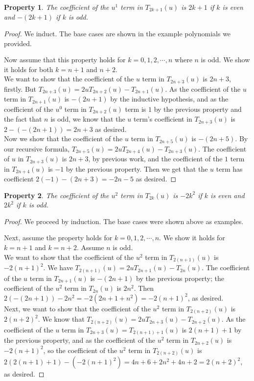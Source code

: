 \documentclass[12pt, letterpaper]{article} %
\newtheorem{theorem}{Property}
\begin{document}
\newpage
\begin{theorem}
The coefficient of the $u^1$ term in $T_{2k+1}(u)$ is $2k+1$ if $k$ is even and $-(2k+1)$ if $k$ is odd.
\end{theorem}

\begin{proof}
We induct. The base cases are shown in the example polynomials we provided.

Now assume that this property holds for $k = 0,1,2,\cdots ,n$ where $n$ is odd. We show it holds for both $k = n+1$ and $n+2$. \\

We want to show that the coefficient of the $u$ term in $T_{2n+3}(u)$ is $2n+3$, firstly. But $T_{2n+3}(u) = 2uT_{2n+2}(u) - T_{2n+1}(u)$. As the coefficient of the $u$ term in $T_{2n+1}(u)$ is $-(2n+1)$ by the inductive hypothesis, and as the coefficient of the $u^0$ term in $T_{2n+2}(u)$ term is $1$ by the previous property and the fact that $n$ is odd, we know that the $u$ term's coefficient in $T_{2n+3}(u)$ is $2 - (-(2n+1)) = 2n + 3$ as desired.\\

Now we show that the coefficient of the $u$ term in $T_{2n+5}(u)$ is $-(2n+5)$. By our recursive formula, $T_{2n+5}(u) = 2uT_{2n+4}(u) - T_{2n+3}(u)$. The coefficient of $u$ in $T_{2n+3}(u)$ is $2n+3$, by previous work, and the coefficient of the $1$ term in $T_{2n+4}(u)$ is $-1$ by the previous property. Then we get that the $u$ term has coefficient $2(-1) - (2n+3) = -2n - 5$ as desired.
\end{proof}

\begin{theorem} The coefficient of the $u^2$ term in $T_{2k}(u)$ is $-2k^2$ if $k$ is even and $2k^2$ if $k$ is odd.
\end{theorem}

\begin{proof}
We proceed by induction. The base cases were shown above as examples.

Next, assume the property holds for $k = 0,1,2,\cdots ,n$. We show it holds for $k = n+1$ and $k = n+2$. Assume $n$ is odd. \\

We want to show that the coefficient of the $u^2$ term in $T_{2(n+1)}(u)$ is $-2(n+1)^2$. We have $T_{2(n+1)}(u) = 2uT_{2n+1}(u) - T_{2n}(u)$. The coefficient of the $u$ term in $T_{2n+1}(u)$ is $-(2n+1)$ by the previous property; the coefficient of the $u^2$ term in $T_{2n}(u)$ is $2n^2$. Then $2(-(2n+1)) - 2n^2 = -2(2n+1+n^2) = -2(n+1)^2$, as desired.\\

Next, we want to show that the coefficient of the $u^2$ term in $T_{2(n+2)}(u)$ is $2(n+2)^2$. We know that $T_{2(n+2)}(u) = 2uT_{2n + 3}(u) - T_{2n + 2}(u)$. As the coefficient of the $u$ term in $T_{2n+3}(u) = T_{2(n+1)+1}(u)$ is $2(n+1) + 1$ by the previous property, and as the coefficient of the $u^2$ term in $T_{2n+2}(u)$ is $-2(n+1)^2$, so the coefficient of the $u^2$ term in $T_{2(n+2)}(u)$ is $2(2(n+1) + 1) - (-2(n+1)^2) = 4n + 6 + 2n^2 + 4n + 2 = 2(n+2)^2$, as desired.
\end{proof}
\end{document}

